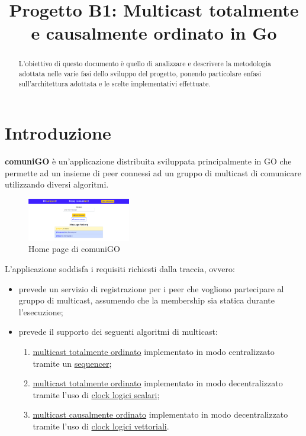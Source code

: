 \documentclass[conference]{IEEEtran}
\begin{document}
\title{Progetto B1: Multicast totalmente e causalmente ordinato in Go}

\author{
}


\maketitle

\begin{abstract}
L'obiettivo di questo documento è quello di analizzare e descrivere la metodologia adottata nelle varie fasi dello sviluppo del progetto, ponendo particolare enfasi sull'architettura adottata e le scelte implementativi effettuate. 
\end{abstract}

\section{Introduzione}
\textbf{comuniGO} è un'applicazione distribuita sviluppata principalmente in GO che permette ad un insieme di peer connessi ad un gruppo di multicast di comunicare utilizzando diversi algoritmi.

\begin{figure}[htbp]
\centerline{\includegraphics[width=0.4\textwidth]{figs/home.png}}
\caption{Home page di comuniGO}
\label{fig:home}
\end{figure}

L'applicazione soddisfa i requisiti richiesti dalla traccia, ovvero:
\begin{itemize}
\item prevede un servizio di registrazione per i peer che vogliono partecipare al gruppo di multicast, assumendo che la membership sia statica durante l'esecuzione;

\item prevede il supporto dei seguenti algoritmi di multicast:
\begin{enumerate}
\item \ul{multicast totalmente ordinato} implementato in modo centralizzato tramite un \ul{sequencer};

\item \ul{multicast totalmente ordinato} implementato in modo decentralizzato tramite l'uso di \ul{clock logici
scalari};

\item \ul{multicast causalmente ordinato} implementato in modo decentralizzato tramite l'uso di \ul{clock
logici vettoriali}.
\end{enumerate}
\end{itemize}
\end{document}
